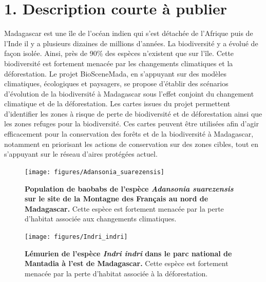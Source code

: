 \documentclass[12pt,]{article}
\title{}
\author{}
\date{}
\begin{document}
{
\setcounter{tocdepth}{2}
\tableofcontents
}
\hypertarget{description-courte-a-publier}{%
\section{1. Description courte à
publier}\label{description-courte-a-publier}}

Madagascar est une île de l'océan indien qui s'est détachée de l'Afrique
puis de l'Inde il y a plusieurs dizaines de millions d'années. La
biodiversité y a évolué de façon isolée. Ainsi, près de 90\% des espèces
n'existent que sur l'île. Cette biodiversité est fortement menacée par
les changements climatiques et la déforestation. Le projet BioSceneMada,
en s'appuyant sur des modèles climatiques, écologiques et paysagers, se
propose d'établir des scénarios d'évolution de la biodiversité à
Madagascar sous l'effet conjoint du changement climatique et de la
déforestation. Les cartes issues du projet permettent d'identifier les
zones à risque de perte de biodiversité et de déforestation ainsi que
les zones refuges pour la biodiversité. Ces cartes peuvent être
utilisées afin d'agir efficacement pour la conservation des forêts et de
la biodiversité à Madagascar, notamment en priorisant les actions de
conservation sur des zones cibles, tout en s'appuyant sur le réseau
d'aires protégées actuel.






\begin{figure}[H]

{\centering \texttt{[image: figures/Adansonia\_suarezensis]} 

}

\caption{\textbf{Population de baobabs de l'espèce
\emph{Adansonia suarezensis} sur le site de la Montagne des Français au
nord de Madagascar.} Cette espèce est fortement menacée par la perte
d'habitat associée aux changements climatiques.}\label{fig:baobab}
\end{figure}





\begin{figure}[H]

{\centering \texttt{[image: figures/Indri\_indri]} 

}

\caption{\textbf{Lémurien de l'espèce \emph{Indri indri} dans le
parc national de Mantadia à l'est de Madagascar.} Cette espèce est
fortement menacée par la perte d'habitat associée à la déforestation.}\label{fig:lemur}
\end{figure}
\end{document}
